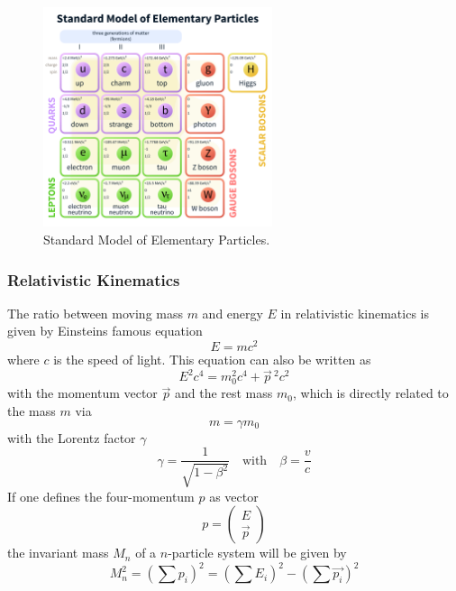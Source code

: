 \documentclass[10pt, a4paper, notitlepage, DIV=15]{scrartcl}
\begin{document}
\begin{figure}[h]
	\centering
	\includegraphics[width=0.6\textwidth]{Standard_model.png}
	\caption{Standard Model of Elementary Particles.}
	\label{fig:standard_model}
\end{figure}
\FloatBarrier
\subsubsection{Relativistic Kinematics}
The ratio between moving mass $m$ and energy $E$ in relativistic kinematics is given by Einsteins famous equation \cite{rebhan}
\begin{equation}
	E=mc^2
\end{equation}
where $c$ is the speed of light. This equation can also be written as \cite{rebhan}
\begin{equation}
	E^2c^4=m_0^2c^4+\vec{p}\,^2c^2
\end{equation}
with the momentum vector $\vec{p}$ and the rest mass $m_0$, which is directly related to the mass $m$ via \cite{rebhan}
\begin{equation}
	m =\gamma m_0
\end{equation}
with the Lorentz factor $\gamma$ \cite{rebhan}
\begin{equation}
	\gamma = \frac{1}{\sqrt{1-\beta^2}} \quad \text{with} \quad \beta = \frac{v}{c} 
\end{equation}
If one defines the four-momentum $p$ as vector \cite{rebhan}
\begin{equation}
	p= \begin{pmatrix}
		E \\ \vec{p}
		\end{pmatrix}
\end{equation}
the invariant mass $M_n$ of a $n$-particle system will be given by \cite{rebhan}
\begin{equation}
	M_n^2 = \left( \sum p_i \right)^2 = \left( \sum E_i \right)^2 - \left( \sum \vec{p_i} \right)^2
\end{equation}
\end{document}

